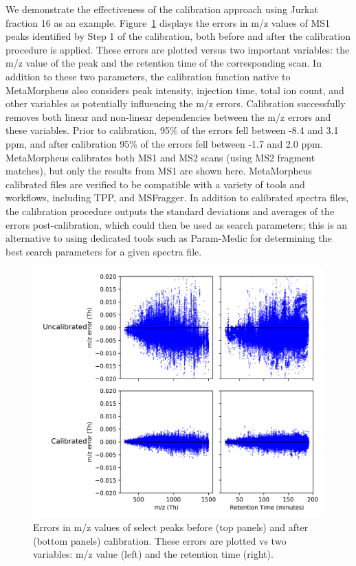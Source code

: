 \documentclass[journal=jprobs,manuscript=article]{achemso}
\begin{document}
We demonstrate the effectiveness of the calibration approach using Jurkat fraction 16 as an example.
Figure~\ref{fgr:fig1-calibErrors} displays the errors in m/z values of MS1 peaks identified by Step 1 of the calibration, both before and after the calibration procedure is applied.
These errors are plotted versus two important variables: the m/z value of the peak and the retention time of the corresponding scan.
In addition to these two parameters, the calibration function native to MetaMorpheus also considers peak intensity, injection time, total ion count, and other variables as potentially influencing the m/z errors.
Calibration successfully removes both linear and non-linear dependencies between the m/z errors and these variables.
Prior to calibration, 95\% of the errors fell between -8.4 and 3.1 ppm, and after calibration 95\% of the errors fell between -1.7 and 2.0 ppm.
MetaMorpheus calibrates both MS1 and MS2 scans (using MS2 fragment matches), but only the results from MS1 are shown here.
MetaMorpheus calibrated files are verified to be compatible with a variety of tools and workflows, including TPP\citep{Deutsch2010}, and MSFragger\citep{Kong_2017}.
In addition to calibrated spectra files, the calibration procedure outputs the standard deviations and averages of the errors post-calibration, which could then be used as search parameters; this is an alternative to using dedicated tools such as Param-Medic\citep{May2017} for determining the best search parameters for a given spectra file.

\begin{figure}[H]
 \includegraphics{fig1-calibErrors.png}
 \caption{Errors in m/z values of select peaks before (top panels) and after (bottom panels) calibration. These errors are plotted vs two variables: m/z value (left) and the retention time (right).}
 \label{fgr:fig1-calibErrors}
\end{figure}
\end{document}
